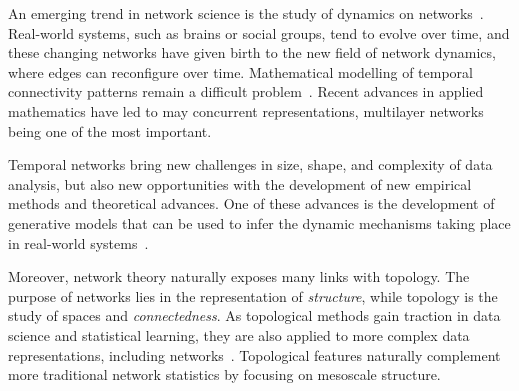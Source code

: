 \documentclass[a4paper,11pt,openany,extrafontsizes]{memoir}
\begin{document}
\begin{figure}
  \caption[Multilayer network.]{}%
  \label{fig:multilayer}
\end{figure}

\captionsetup[figure]{labelformat=default}

An emerging trend in network science is the study of dynamics on
networks~\cite{holme_temporal_2012, holme_modern_2015,
  porter_dynamical_2014}. Real-world systems, such as brains or social
groups, tend to evolve over time, and these changing networks have
given birth to the new field of network dynamics, where edges can
reconfigure over time. Mathematical modelling of temporal connectivity
patterns remain a difficult
problem~\cite{bassett_network_2017}. Recent advances in applied
mathematics have led to may concurrent representations, multilayer
networks~\cite{kivela_multilayer_2014} being one of the most
important.

Temporal networks bring new challenges in size, shape, and complexity
of data analysis, but also new opportunities with the development of
new empirical methods and theoretical advances. One of these advances
is the development of generative models that can be used to infer the
dynamic mechanisms taking place in real-world
systems~\cite{bazzi_generative_2016, gauvin_randomized_2018,
  petri_simplicial_2018}.

Moreover, network theory naturally exposes many links with
topology. The purpose of networks lies in the representation of
\emph{structure}, while topology is the study of spaces and
\emph{connectedness}. As topological methods gain traction in data
science and statistical learning, they are also applied to more
complex data representations, including
networks~\cite{horak_persistent_2009, petri_topological_2013,
  stolz_persistent_2017}. Topological features naturally complement
more traditional network statistics by focusing on mesoscale
structure.
\end{document}
